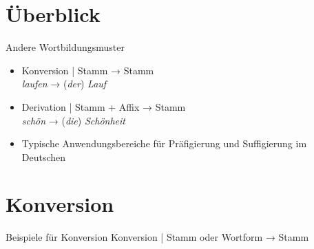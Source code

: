 \section{Überblick}

\begin{frame}
  {Andere Wortbildungsmuster}
  \onslide<+->
  \begin{itemize}[<+->]
    \item \alert{Konversion} | Stamm → Stamm \\ 
      \textit{laufen} → (\textit{der}) \textit{Lauf}
      \Zeile
    \item \alert{Derivation} | Stamm + Affix → Stamm\\
      \textit{schön} → (\textit{die}) \textit{Schönheit}
      \Halbzeile
    \item Typische Anwendungsbereiche für \alert{Präfigierung} und \alert{Suffigierung} im Deutschen
  \end{itemize}
\end{frame}

\section{Konversion}

\begin{frame}
  {Beispiele für Konversion}
  \pause
  Konversion | \alert{Stamm oder Wortform → Stamm}
  \Halbzeile
  \pause
  \begin{exe}
    \pause
    \pause
    \pause
    \pause
    \pause
    \pause
    \pause
  \end{exe}
\end{frame}

